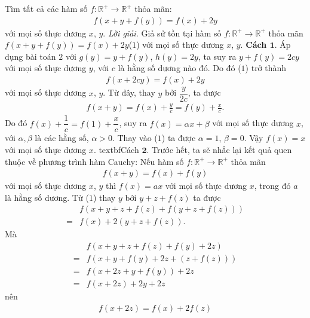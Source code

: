 \begin{multicols}{2}
		Tìm tất cả các hàm số $f:\mathbb{R^+}  \to \mathbb{R^+} $ thỏa mãn:
		\begin{align*}
			f(x+y+f(y))=f(x)+2 y
		\end{align*}
		với mọi số thực dương $x$, $y$.
		\vskip 0.1cm
		\textit{Lời giải.} Giả sử tồn tại hàm số $f:\mathbb{R^+}  \to \mathbb{R^+} $ thỏa mãn 
			$f(x+y+f(y))=f(x)+2 y $\hfill ($1$)
			\vskip 0.1cm
			với mọi số thực dương $x$, $y$.
			\vskip 0.1cm
			\textbf{\color{hoccungpi}Cách $\pmb{1.}$} 
			Áp dụng bài toán $2$ với $g(y)=y+f(y)$, $h(y)=2y$, ta suy ra
			$y + f(y) = 2cy$ với mọi số thực dương $y$, 
			với $c$ là hằng số dương nào đó. Do đó ($1$) trở thành
			\begin{align*}
				f(x + 2cy) = f(x) + 2y
			\end{align*}
			với mọi số thực dương $x$, $y$.
			Từ đây, thay $y$ bởi $\dfrac{y}{{2c}}$, ta được
			\begin{align*}
				f(x + y) = f(x) + \frac{y}{c}= f(y) + \frac{x}{c}.
			\end{align*}
			Do đó $ f(x) + \dfrac{1}{c} = f(1) + \dfrac{x}{c}$, suy ra
			$f(x) = \alpha x + \beta$ với mọi số thực dương $x$, với $\alpha ,\beta $ là các hằng số, $\alpha >0$. Thay vào ($1$) ta được
			$\alpha  = 1$, $\beta  = 0$. Vậy 
			$f(x)= x$ 	với mọi số thực dương $x$.
			\vskip 0.1cm
			textbf{Cách $\pmb{2.}$} 
			Trước hết,  ta sẽ nhắc lại kết quả quen thuộc về phương trình hàm Cauchy: Nếu hàm số 	$f:\mathbb{R^+}  \to \mathbb{R^+} $ thỏa mãn 
			\begin{align*}
				f(x+y)=f(x)+f(y)
			\end{align*}
			với mọi số thực dương $x$, $y$ thì $f(x)=ax$ với mọi số thực dương $x$, trong đó $a$ là hằng số dương.
			Từ ($1$) thay $y$ bởi $y+z+f(z)$ ta được
			\begin{align*}
				&f\left( {x + y + z + f(z) + f\left( {y + z + f(z)} \right)} \right)\\
				= &f(x) + 2\left( {y + z + f(z)} \right).
			\end{align*}
			Mà
			\begin{align*}
				&f\left( {x + y + z + f(z) + f(y) + 2z} \right) \\
				=&  f\left( {x + y + f(y) + 2z + \left( {z + f(z)} \right)} \right) \\
				=&f\left( {x + 2z + y + f(y)} \right) + 2z\\
				=& f\left( {x + 2z} \right) + 2y + 2z 
			\end{align*}
			nên 
			\begin{align*}
				f\left( {x + 2z} \right) = f(x) + 2f(z)\tag{$2$}

\end{align*}
\end{multicols}
